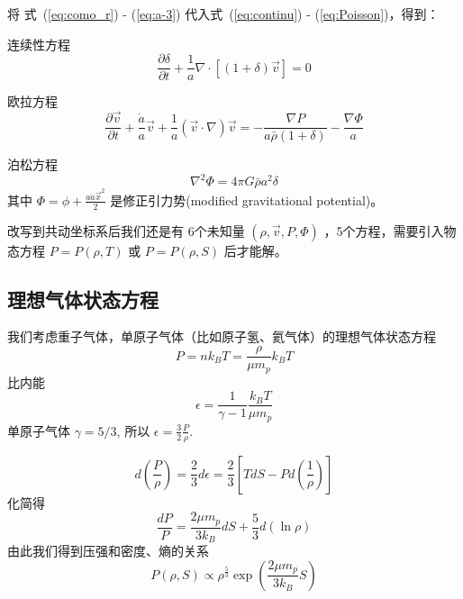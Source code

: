 \documentclass[12pt]{ctexart}
\newcommand{\refeqs}[2]{式~(\ref{#1}) - (\ref{#2})}
\begin{document}
将 \refeqs{eq:como_r}{eq:a-3} 代入\refeqs{eq:continu}{eq:Poisson}，得到：

连续性方程
\begin{equation}
    \frac{\partial \delta}{\partial t}+\frac{1}{a} \nabla \cdot[(1+\delta) \vec{v}]=0
\end{equation}

欧拉方程
\begin{equation} \label{eq:Euler-como}
    \frac{\partial \vec{v}}{\partial t}+\frac{\dot{a}}{a} \vec{v}+\frac{1}{a}(\vec{v} \cdot \nabla) \vec{v}=-\frac{\nabla P}{a \bar{\rho}(1+\delta)}-\frac{\nabla \Phi}{a}
\end{equation}


泊松方程
\begin{equation} \label{eq:Poisson-como}
    \nabla^{2} \Phi=4 \pi G \bar{\rho} a^{2} \delta
\end{equation}
其中 $\Phi = \phi + \frac{a \ddot{a} \vec{x}^2}{2}$ 是修正引力势(modified gravitational potential)。

改写到共动坐标系后我们还是有 6个未知量 $\left(\rho, \vec{v}, P, \Phi\right)$ ，5个方程，需要引入物态方程 $P=P\left(\rho, T\right)$ 或 $P=P\left(\rho,  S\right)$ 后才能解。

\subsection{理想气体状态方程}

我们考虑重子气体，单原子气体（比如原子氢、氦气体）的理想气体状态方程
\begin{equation}
    P=nk_BT =\frac{\rho}{\mu m_p} k_B T
\end{equation}
比内能
\begin{equation}
    \epsilon = \frac{1}{\gamma -1} \frac{k_B T}{\mu m_p}
\end{equation}
单原子气体 $\gamma=5/3$, 
所以 $\epsilon=\frac{3}{2}\frac{P}{\rho}$.

\begin{equation}
    d\left(\frac{P}{\rho}\right) = \frac{2}{3} d\epsilon = \frac{2}{3} \left[T dS - Pd\left(\frac{1}{\rho}\right) \right] 
\end{equation}
化简得
\begin{equation}
    \frac{dP}{P} = \frac{2\mu m_p}{3k_B} dS + \frac{5}{3} d \left(\ln \rho \right) 
\end{equation}
由此我们得到压强和密度、熵的关系
\begin{equation} \label{eq:EOM}
    P\left(\rho, S\right) \propto \rho^\frac{5}{3} \exp\left(\frac{2\mu m_p}{3k_B} S\right) 
\end{equation}
\end{document}
